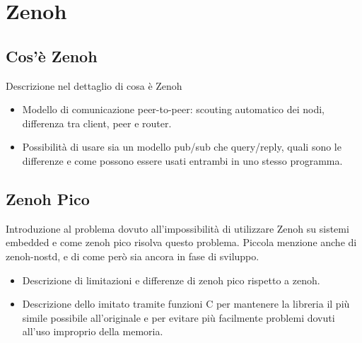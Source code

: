 \chapter{Zenoh}
\label{chap:zenoh}

\section{Cos'è Zenoh}
\label{sec:what-is-zenoh}

Descrizione nel dettaglio di cosa è Zenoh
\begin{itemize}
	\item Modello di comunicazione peer-to-peer: scouting automatico dei nodi,
	differenza tra client, peer e router.
	\item Possibilità di usare sia un modello pub/sub che query/reply, quali sono
	le differenze e come possono essere usati entrambi in uno stesso programma.
\end{itemize}

\section{Zenoh Pico}
\label{sec:zenoh-pico}

Introduzione al problema dovuto all'impossibilità di utilizzare Zenoh su sistemi
embedded e come zenoh pico risolva questo problema. Piccola menzione anche di
zenoh-nostd, e di come però sia ancora in fase di sviluppo.
\begin{itemize}
	\item Descrizione di limitazioni e differenze di zenoh pico rispetto a zenoh.
	\item Descrizione dello  imitato tramite funzioni C per
	mantenere la libreria il più simile possibile all'originale e per evitare
	più facilmente problemi dovuti all'uso improprio della memoria.
\end{itemize}

